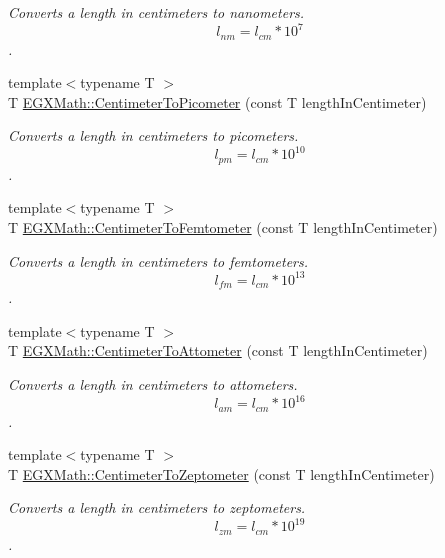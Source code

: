 \begin{DoxyCompactItemize}
\begin{DoxyCompactList}\small\item\em Converts a length in centimeters to nanometers. \[ l_{nm}=l_{cm} * 10^{7} \]. \end{DoxyCompactList}\item 
{\footnotesize template$<$typename T $>$ }\\T \mbox{\hyperlink{group___e_g_x_math-_conversions-_length_conversions-_s_i-_centimeter-_s_i_ga7e2851b0052f1b135a84aa860495e4ba}{E\+G\+X\+Math\+::\+Centimeter\+To\+Picometer}} (const T length\+In\+Centimeter)
\begin{DoxyCompactList}\small\item\em Converts a length in centimeters to picometers. \[ l_{pm}=l_{cm} * 10^{10} \]. \end{DoxyCompactList}\item 
{\footnotesize template$<$typename T $>$ }\\T \mbox{\hyperlink{group___e_g_x_math-_conversions-_length_conversions-_s_i-_centimeter-_s_i_ga1d86301dcf9e8d9d75127c3d998f9c0b}{E\+G\+X\+Math\+::\+Centimeter\+To\+Femtometer}} (const T length\+In\+Centimeter)
\begin{DoxyCompactList}\small\item\em Converts a length in centimeters to femtometers. \[ l_{fm}=l_{cm} * 10^{13} \]. \end{DoxyCompactList}\item 
{\footnotesize template$<$typename T $>$ }\\T \mbox{\hyperlink{group___e_g_x_math-_conversions-_length_conversions-_s_i-_centimeter-_s_i_ga72eb99d67c7923a3b17886b47a0fa14d}{E\+G\+X\+Math\+::\+Centimeter\+To\+Attometer}} (const T length\+In\+Centimeter)
\begin{DoxyCompactList}\small\item\em Converts a length in centimeters to attometers. \[ l_{am}=l_{cm} * 10^{16} \]. \end{DoxyCompactList}\item 
{\footnotesize template$<$typename T $>$ }\\T \mbox{\hyperlink{group___e_g_x_math-_conversions-_length_conversions-_s_i-_centimeter-_s_i_ga1f7a10f9710f514dcc9132d4ce1f0bfa}{E\+G\+X\+Math\+::\+Centimeter\+To\+Zeptometer}} (const T length\+In\+Centimeter)
\begin{DoxyCompactList}\small\item\em Converts a length in centimeters to zeptometers. \[ l_{zm}=l_{cm} * 10^{19} \]. \end{DoxyCompactList}\item 

\end{DoxyCompactItemize}
